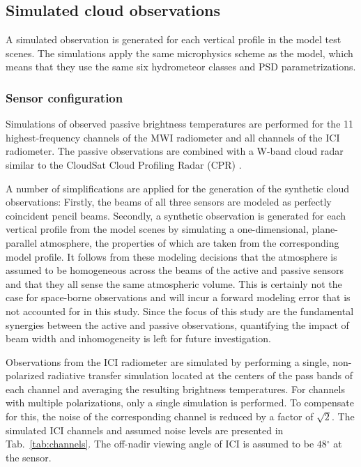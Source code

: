 \documentclass[journal abbreviation, manuscript]{copernicus}
\begin{document}
\subsection{Simulated cloud observations}

A simulated observation is generated for each vertical profile in the
model test scenes. The simulations apply the same microphysics scheme
as the model, which means that they use the same six hydrometeor classes
and PSD parametrizations.

\subsubsection{Sensor configuration}
\label{sec:sensors}

Simulations of observed passive brightness temperatures are performed for the 11
highest-frequency channels of the MWI radiometer and all channels of the ICI
radiometer. The passive observations are combined with a W-band cloud radar
similar to the CloudSat Cloud Profiling Radar (CPR)
\citep{stephens02,tanelli08}. 

A number of simplifications are applied for the generation of the synthetic
cloud observations: Firstly, the beams of all three sensors are modeled as
perfectly coincident pencil beams. Secondly, a synthetic observation is
generated for each vertical profile from the model scenes by simulating a
one-dimensional, plane-parallel atmosphere, the properties of which are taken
from the corresponding model profile. It follows from these modeling decisions
that the atmosphere is assumed to be homogeneous across the beams of the active
and passive sensors and that they all sense the same atmospheric volume. This is
certainly not the case for space-borne observations and will incur a forward
modeling error that is not accounted for in this study. Since the focus of this
study are the fundamental synergies between the active and passive observations,
quantifying the impact of beam width and inhomogeneity is left for future
investigation.

Observations from the ICI radiometer are simulated by performing a single,
non-polarized radiative transfer simulation located at the centers of the pass
bands of each channel and averaging the resulting brightness temperatures. For
channels with multiple polarizations, only a single simulation is performed.
To compensate for this, the noise of the corresponding channel is reduced by a
factor of $\sqrt{2}$. The simulated ICI channels and assumed noise levels are
presented in  Tab.~\ref{tab:channels}. The off-nadir viewing angle of ICI
is assumed to be $48\unit{^\circ}$ at the sensor.
\end{document}
